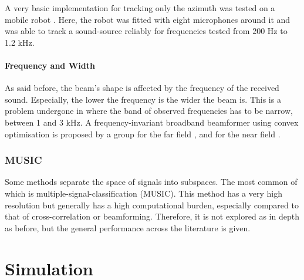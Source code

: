\documentclass{report}
\begin{document}
A very basic implementation for tracking only the azimuth was tested on a mobile robot \cite{mattos_passive_2004}. Here, the robot was fitted with eight microphones around it and was able to track a sound-source reliably for frequencies tested from 200 \si{Hz} to 1.2 \si{kHz}.

\subsubsection{Frequency and Width}

As said before, the beam's shape is affected by the frequency of the received sound. Especially, the lower the frequency is the wider the beam is. This is a problem undergone in \cite{tamai_three_2005} where the band of observed frequencies has to be narrow, between 1 and 3 \si{kHz}. A frequency-invariant broadband beamformer using convex optimisation is proposed by a group for the far field \cite{argentieri_experimental_2005}, \cite{argentieri_prototyping_2005} and for the near field \cite{argentieri_modal_2006}.

\subsection{MUSIC}

Some methods separate the space of signals into subspaces. The most common of which is multiple-signal-classification (MUSIC). This method has a very high resolution but generally has a high computational burden, especially compared to that of cross-correlation or beamforming. Therefore, it is not explored as in depth as before, but the general performance across the literature is given.

\chapter{Simulation}

\nocite{*}





%
%
%
\end{document}
